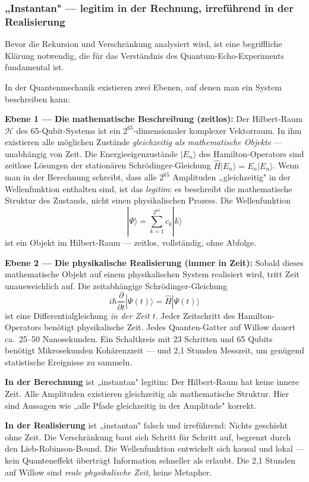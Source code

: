 \subsubsection*{„Instantan" — legitim in der Rechnung, irreführend in der Realisierung}

Bevor die Rekursion und Verschränkung analysiert wird, ist eine begriffliche
Klärung notwendig, die für das Verständnis des Quantum-Echo-Experiments fundamental ist.

In der Quantenmechanik existieren zwei Ebenen, auf denen man ein System beschreiben kann:

\textbf{Ebene 1 — Die mathematische Beschreibung (zeitlos):}
Der Hilbert-Raum $\mathcal{H}$ des 65-Qubit-Systems ist ein
$2^{65}$-dimensionaler komplexer Vektorraum. In ihm existieren alle möglichen
Zustände \emph{gleichzeitig als mathematische Objekte} — unabhängig von Zeit.
Die Energieeigenzustände $|E_n\rangle$ des Hamilton-Operators sind zeitlose
Lösungen der stationären Schrödinger-Gleichung $\hat{H}|E_n\rangle = E_n|E_n\rangle$.
Wenn man in der Berechnung schreibt, dass alle $2^{65}$ Amplituden
„gleichzeitig" in der Wellenfunktion enthalten sind, ist das \emph{legitim}:
es beschreibt die mathematische Struktur des Zustands, nicht einen physikalischen
Prozess. Die Wellenfunktion
\begin{equation}
    |\Psi\rangle = \sum_{k=1}^{2^{65}} c_k |k\rangle
\end{equation}
ist ein Objekt im Hilbert-Raum — zeitlos, vollständig, ohne Abfolge.

\textbf{Ebene 2 — Die physikalische Realisierung (immer in Zeit):}
Sobald dieses mathematische Objekt auf einem physikalischen System realisiert wird,
tritt Zeit unausweichlich auf. Die zeitabhängige Schrödinger-Gleichung
\begin{equation}
    i\hbar \frac{\partial}{\partial t}|\Psi(t)\rangle = \hat{H}|\Psi(t)\rangle
\end{equation}
ist eine Differentialgleichung \emph{in der Zeit $t$}. Jeder Zeitschritt des
Hamilton-Operators benötigt physikalische Zeit. Jedes Quanten-Gatter auf Willow
dauert ca.\ 25--50 Nanosekunden. Ein Schaltkreis mit 23 Schritten und 65 Qubits
benötigt Mikrosekunden Kohärenzzeit — und 2,1 Stunden Messzeit, um genügend
statistische Ereignisse zu sammeln.

\begin{important}
\textbf{In der Berechnung} ist „instantan" legitim: Der Hilbert-Raum hat keine
innere Zeit. Alle Amplituden existieren gleichzeitig als mathematische Struktur.
Hier sind Aussagen wie „alle Pfade gleichzeitig in der Amplitude" korrekt.

\textbf{In der Realisierung} ist „instantan" falsch und irreführend: Nichts
geschieht ohne Zeit. Die Verschränkung baut sich Schritt für Schritt auf,
begrenzt durch den Lieb-Robinson-Bound. Die Wellenfunktion entwickelt sich
kausal und lokal — kein Quanteneffekt überträgt Information schneller als erlaubt.
Die 2,1 Stunden auf Willow sind \emph{reale physikalische Zeit}, keine Metapher.
\end{important}

